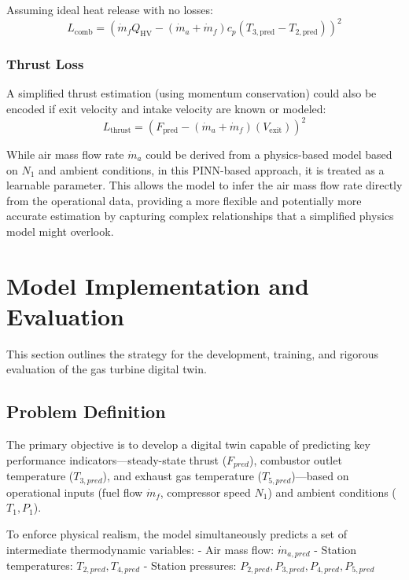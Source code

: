 \documentclass[
  12pt,
  oneside,
  a4paper,
  english,
  brazil]{abntex2}
\begin{document}
Assuming ideal heat release with no losses: \[
L_{\text{comb}} = \left( \dot{m}_f Q_{\text{HV}} - (\dot{m}_a + \dot{m}_f) c_p (T_{3,\text{pred}} - T_{2,\text{pred}}) \right)^2
\]

\subsubsection{Thrust Loss}\label{thrust-loss}

A simplified thrust estimation (using momentum conservation) could also
be encoded if exit velocity and intake velocity are known or modeled: \[
L_{\text{thrust}} = \left( F_{\text{pred}} - (\dot{m}_a + \dot{m}_f) (V_{\text{exit}}) \right)^2
\]

While air mass flow rate \(\dot{m}_a\) could be derived from a
physics-based model based on \(N_1\) and ambient conditions, in this
PINN-based approach, it is treated as a learnable parameter. This allows
the model to infer the air mass flow rate directly from the operational
data, providing a more flexible and potentially more accurate estimation
by capturing complex relationships that a simplified physics model might
overlook.

\section{\texorpdfstring{\textbf{Model Implementation and
Evaluation}}{Model Implementation and Evaluation}}\label{model-implementation-and-evaluation}

This section outlines the strategy for the development, training, and
rigorous evaluation of the gas turbine digital twin.

\subsection{Problem Definition}\label{problem-definition}

The primary objective is to develop a digital twin capable of predicting
key performance indicators---steady-state thrust (\(F_{pred}\)),
combustor outlet temperature (\(T_{3,pred}\)), and exhaust gas
temperature (\(T_{5,pred}\))---based on operational inputs (fuel flow
\(\dot{m}_f\), compressor speed \(N_1\)) and ambient conditions
(\(T_1, P_1\)).

To enforce physical realism, the model simultaneously predicts a set of
intermediate thermodynamic variables: - Air mass flow:
\(\dot{m}_{a,pred}\) - Station temperatures: \(T_{2,pred}, T_{4,pred}\)
- Station pressures: \(P_{2,pred}, P_{3,pred}, P_{4,pred}, P_{5,pred}\)
\end{document}
